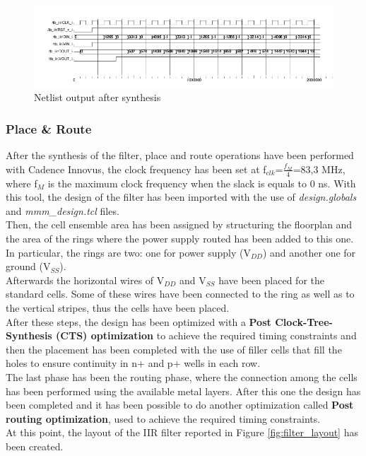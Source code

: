 \documentclass[a4paper, titlepage]{article}
\begin{document}
 \begin{figure} [h]
\centering
	\includegraphics[scale=0.9]{start_sim_post_synth.png}
	\caption{Netlist output after synthesis}
	\label{fig:y_post_synth}
\end{figure}

\newpage
\subsubsection{Place \& Route}
After the synthesis of the filter, place and route operations have been performed with Cadence Innovus,  the clock frequency has been set at f$_{clk}$=$\frac{f_M}{4}$=83,3 MHz, where f$_M$ is the maximum clock frequency when the slack is equals to 0 ns. With this tool, the design of the filter has been imported with the use of \textit{design.globals} and \textit{mmm\_design.tcl} files.\\Then, the cell ensemble area has been assigned by structuring the floorplan and the area of the rings where the power supply routed has been added to this one. %
In particular, the rings are two: one for power supply (V$_{DD}$) and another one for ground (V$_{SS}$).\\Afterwards the horizontal wires of V$_{DD}$ and V$_{SS}$ have been placed for the standard cells. Some of these wires have been connected to the ring as well as to the vertical stripes, thus the cells have been placed.\\
After these steps, the design has been optimized with a \textbf{Post Clock-Tree-Synthesis (CTS) optimization} to achieve the required timing constraints and then the placement has been completed with the use of filler cells that fill the holes to ensure continuity in n+ and p+ wells in each row.\\The last phase has been the routing phase, where the connection among the cells has been performed using the available metal layers. After this one the design has been completed and it has been possible to do another optimization called \textbf{Post routing optimization}, used to achieve the required timing constraints.\\At this point, the layout of the IIR filter reported in Figure \ref{fig:filter_layout} has been created.
\end{document}
